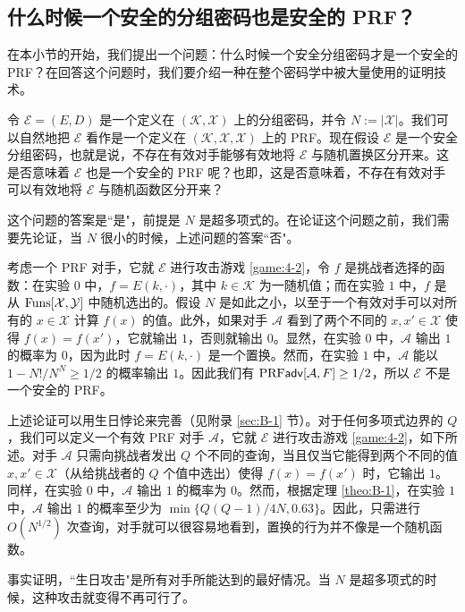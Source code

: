 \subsection{什么时候一个安全的分组密码也是安全的 PRF？}\label{subsec:4-4-3}

在本小节的开始，我们提出一个问题：什么时候一个安全分组密码才是一个安全的 PRF？在回答这个问题时，我们要介绍一种在整个密码学中被大量使用的证明技术。

令 $\mathcal{E}=(E,D)$ 是一个定义在 $(\mathcal{K},\mathcal{X})$ 上的分组密码，并令 $N:=|\mathcal{X}|$。我们可以自然地把 $\mathcal{E}$ 看作是一个定义在 $(\mathcal{K},\mathcal{X},\mathcal{X})$ 上的 PRF。现在假设 $\mathcal{E}$ 是一个安全分组密码，也就是说，不存在有效对手能够有效地将 $\mathcal{E}$ 与随机置换区分开来。这是否意味着 $\mathcal{E}$ 也是一个安全的 PRF 呢？也即，这是否意味着，不存在有效对手可以有效地将 $\mathcal{E}$ 与随机函数区分开来？

这个问题的答案是``是"，前提是 $N$ 是超多项式的。在论证这个问题之前，我们需要先论证，当 $N$ 很小的时候，上述问题的答案``否"。

考虑一个 PRF 对手，它就 $\mathcal{E}$ 进行攻击游戏 \ref{game:4-2}，令 $f$ 是挑战者选择的函数：在实验 $0$ 中，$f=E(k,\cdot)$，其中 $k\in\mathcal{K}$ 为一随机值；而在实验 $1$ 中，$f$ 是从 ${\rm Funs}[\mathcal{X},\mathcal{Y}]$ 中随机选出的。假设 $N$ 是如此之小，以至于一个有效对手可以对所有的 $x\in\mathcal{X}$ 计算 $f(x)$ 的值。此外，如果对手 $\mathcal{A}$ 看到了两个不同的 $x,x'\in\mathcal{X}$ 使得 $f(x)=f(x')$，它就输出 $1$，否则就输出 $0$。显然，在实验 $0$ 中，$\mathcal{A}$ 输出 $1$ 的概率为 $0$，因为此时 $f=E(k,\cdot)$ 是一个置换。然而，在实验 $1$ 中，$\mathcal{A}$ 能以 $1-{N!}/{N^N}\geq{1}/{2}$ 的概率输出 $1$。因此我们有 ${\rm PRF\mathsf{adv}}[\mathcal{A}, F]\geq{1/2}$，所以 $\mathcal{E}$ 不是一个安全的 PRF。

上述论证可以用生日悖论来完善（见附录 \ref{sec:B-1} 节）。对于任何多项式边界的 $Q$，我们可以定义一个有效 PRF 对手 $\mathcal{A}$，它就 $\mathcal{E}$ 进行攻击游戏 \ref{game:4-2}，如下所述。对手 $\mathcal{A}$ 只需向挑战者发出 $Q$ 个不同的查询，当且仅当它能得到两个不同的值 $x,x'\in\mathcal{X}$（从给挑战者的 $Q$ 个值中选出）使得 $f(x)=f(x')$ 时，它输出 $1$。同样，在实验 $0$ 中，$\mathcal{A}$ 输出 $1$ 的概率为 $0$。然而，根据定理 \ref{theo:B-1}，在实验 $1$ 中，$\mathcal{A}$ 输出 $1$ 的概率至少为 $\min\{{Q(Q-1)}/{4N},0.63\}$。因此，只需进行 $O(N^{1/2})$ 次查询，对手就可以很容易地看到，置换的行为并不像是一个随机函数。

事实证明，``生日攻击"是所有对手所能达到的最好情况。当 $N$ 是超多项式的时候，这种攻击就变得不再可行了。

